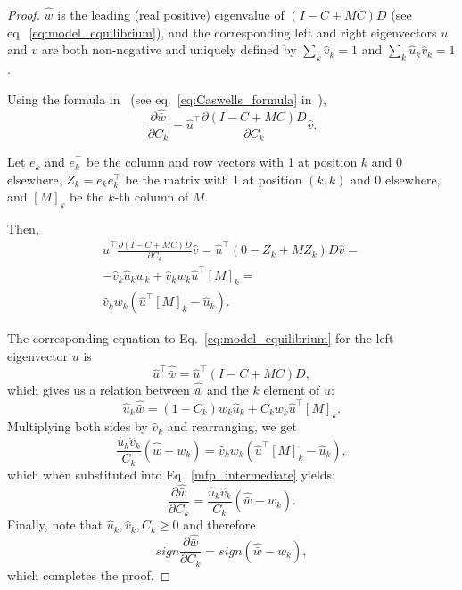 \documentclass[9pt, a4paper, twocolumn]{extarticle}
\newcommand*{\tr}{^\intercal}
\begin{document}
\begin{proof}
$\hat{\bar w}$ is the leading (real positive) eigenvalue of $(I-C+MC)D$ (see eq.~\ref{eq:model_equilibrium}),
and the corresponding left and right eigenvectors $u$ and $v$ are both non-negative and uniquely defined by $\sum_k{\hat v_k} = 1$ and $\sum_k{\hat u_k \hat v_k} = 1$.

Using the formula in~\citet{Caswell1978} (see eq.~\ref{eq:Caswells_formula} in~),
\begin{equation}
\frac{\partial \hat{\bar w}}{\partial C_k} = 
\hat u\tr \frac{\partial (I-C+MC)D}{\partial C_k} \hat v.
\end{equation}

Let $e_k$ and $e\tr_k$ be the column and row vectors with 1 at position $k$ and 0 elsewhere, $Z_k = e_k e\tr_k$ be the matrix with 1 at position $(k,k)$ and 0 elsewhere, and $[M]_k$ be the $k$-th column of $M$.

Then,
\begin{equation}\label{mfp_intermediate}
\begin{aligned}
\hat u\tr \frac{\partial (I-C+MC)D}{\partial C_k} \hat v = 
\hat u\tr (0 - Z_k + M Z_k)D \hat v = \\
-\hat v_k \hat u_k w_k + \hat v_k w_k \hat u\tr[M]_k = \\
\hat v_k w_k (\hat u\tr[M]_k - \hat u_k). 
\end{aligned}
\end{equation}

The corresponding equation to Eq.~\ref{eq:model_equilibrium} for the left
eigenvector $u$ is 
\begin{equation}
\hat u\tr \hat{\bar w} = \hat u\tr (I - C + MC) D,
\end{equation}
which gives us a relation between $\hat{\bar w}$ and the $k$
element of $u$:
\begin{equation}
\hat u_k \hat{\bar w} = (1-C_k) w_k \hat u_k + C_k w_k \hat u\tr [M]_k.
\end{equation}
Multiplying both sides by $\hat v_k$  and rearranging, we get 
\begin{equation}
\frac{\hat u_k \hat v_k}{C_k} (\hat{\bar w} - w_k) = \hat v_k w_k (\hat u\tr [M]_k - \hat u_k),
\end{equation}
which when substituted into Eq.~\ref{mfp_intermediate} yields:
\begin{equation}
\frac{\partial \hat{\bar w}}{\partial C_k} = 
\frac{\hat u_k \hat v_k}{C_k} (\hat{\bar w} - w_k).
\end{equation}
Finally, note that $\hat u_k, \hat v_k, C_k \ge 0$ and therefore
\begin{equation}
sign \frac{\partial \hat{\bar w}}{\partial C_k} = 
sign (\hat{\bar w} - w_k),
\end{equation}
which completes the proof.
\end{proof}
\end{document}
